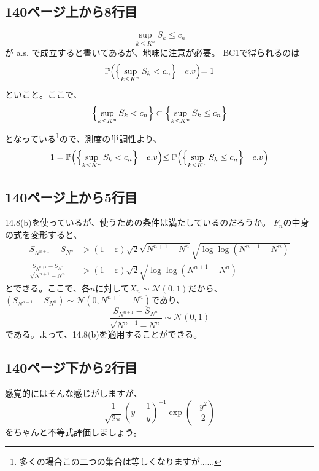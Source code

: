   \subsection{140ページ上から8行目}
    \[
      \sup_{k \leq K^n}S_k \leq c_n
    \]
    が a.s. で成立すると書いてあるが、地味に注意が必要。
    BC1で得られるのは
    \[
      {\mathbb{P}}\Bigl(\Bigl\{\sup_{k \leq K^n}S_k < c_n \Bigr\} \quad e.v\Bigl) = 1
    \]
    といこと。ここで、
    \[
      \Bigl\{\sup_{k \leq K^n}S_k < c_n \Bigr\} \subset \Bigl\{\sup_{k \leq K^n}S_k \leq c_n \Bigr\}
    \]
    となっている\footnote{多くの場合この二つの集合は等しくなりますが......}ので、測度の単調性より、
    \[
      1 = {\mathbb{P}}\Bigl(\Bigl\{\sup_{k \leq K^n}S_k < c_n \Bigr\} \quad e.v\Bigl) \leq {\mathbb{P}}\Bigl(\Bigl\{\sup_{k \leq K^n}S_k \leq c_n \Bigr\} \quad e.v\Bigl)
    \]

  \subsection{140ページ上から5行目}
    14.8(b)を使っているが、使うための条件は満たしているのだろうか。
    $F_n$の中身の式を変形すると、
    \begin{align*}
      S_{N^{n+1}} - S_{N^n} &> (1 - \varepsilon)\sqrt{2}\sqrt{N^{n+1} - N^n}\sqrt{\log\log(N^{n+1} - N^n)} \\
      \frac{S_{N^{n+1}} - S_{N^n}}{\sqrt{N^{n+1} - N^n}} &> (1 - \varepsilon)\sqrt{2}\sqrt{\log\log(N^{n+1} - N^n)}
    \end{align*}
    とできる。ここで、各$n$に対して$X_n \sim \mathcal{N}(0,1)$だから、
    $(S_{N^{n+1}} - S_{N^n}) \sim \mathcal{N}(0,N^{n+1} - N^n)$であり、
    \[
      \frac{S_{N^{n+1}} - S_{N^n}}{\sqrt{N^{n+1} - N^n}} \sim \mathcal{N}(0,1)
    \]
    である。よって、14.8(b)を適用することができる。

  \subsection{140ページ下から2行目}
    感覚的にはそんな感じがしますが、
    \[
      \frac{1}{\sqrt{2\pi}}\left( y + \frac{1}{y} \right)^{-1}\exp\left( -\frac{y^2}{2}\right)
    \]
    をちゃんと不等式評価しましょう。

